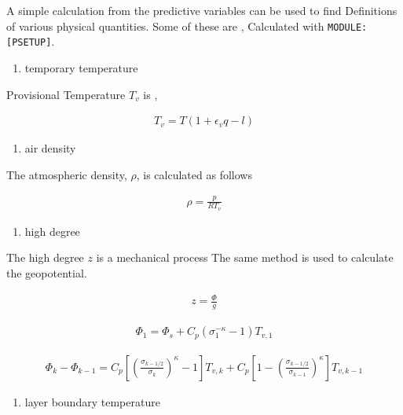 A simple calculation from the predictive variables can be used to find
Definitions of various physical quantities. Some of these are ,
Calculated with \texttt{MODULE:{[}PSETUP{]}}.

\begin{enumerate}
\def\labelenumi{\arabic{enumi}.}
\tightlist
\item
  temporary temperature
\end{enumerate}

Provisional Temperature \(T_v\) is ,

\begin{eqnarray}
  T_v = T ( 1 + \epsilon_v q - l )
\end{eqnarray}

\begin{enumerate}
\def\labelenumi{\arabic{enumi}.}
\setcounter{enumi}{1}
\tightlist
\item
  air density
\end{enumerate}

The atmospheric density, \(\rho\), is calculated as follows

\begin{eqnarray}
  \rho = \frac{p}{RT_v}
\end{eqnarray}

\begin{enumerate}
\def\labelenumi{\arabic{enumi}.}
\setcounter{enumi}{2}
\tightlist
\item
  high degree
\end{enumerate}

The high degree \(z\) is a mechanical process The same method is used to
calculate the geopotential.

\begin{eqnarray}
  z = \frac{\Phi}{g} 
\end{eqnarray}

\begin{eqnarray}
 \Phi_{1}  =  \Phi_{s} + C_{p} ( \sigma_{1}^{-\kappa} - 1  ) T_{v,1}
\end{eqnarray}

\begin{eqnarray}
 \Phi_k - \Phi_{k-1} 
   =  C_{p}
   \left[ \left( \frac{ \sigma_{k-1/2} }{ \sigma_k } \right)^{\kappa}
          - 1 \right] T_{v,k} 
       + C_{p}
   \left[ 1- 
         \left( \frac{ \sigma_{k-1/2} }{ \sigma_{k-1} } \right)^{\kappa}
              \right] T_{v,k-1}
\end{eqnarray}

\begin{enumerate}
\def\labelenumi{\arabic{enumi}.}
\setcounter{enumi}{3}
\tightlist
\item
  layer boundary temperature
\end{enumerate}

